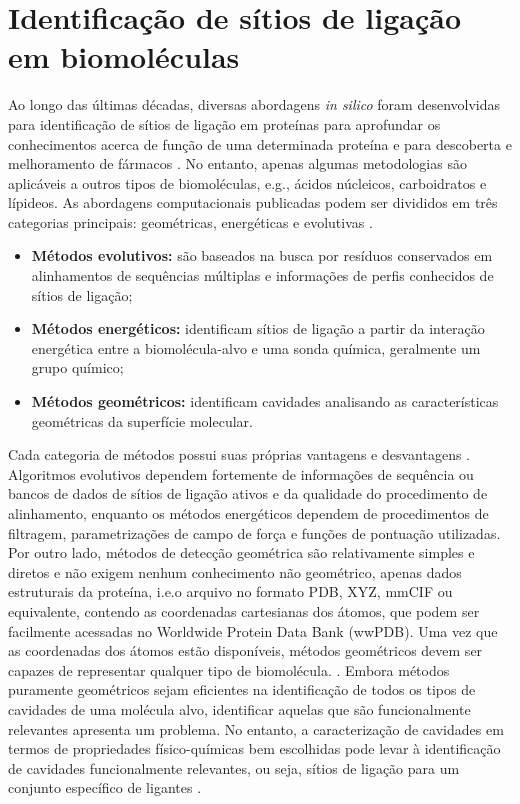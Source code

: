 \documentclass[Portugues]{phdquali}
\def\ie{i.e.\onedot}
\def\eg{e.g.\onedot}
\begin{document}
\section{Identificação de sítios de ligação em biomoléculas \label{sec:binding-sites}}

Ao longo das últimas décadas, diversas abordagens \textit{in silico} foram desenvolvidas para identificação de sítios de ligação em proteínas para aprofundar os conhecimentos acerca de função de uma determinada proteína e para descoberta e melhoramento de fármacos \cite{liang1998}. No entanto, apenas algumas metodologias são aplicáveis a outros tipos de biomoléculas, \eg, ácidos núcleicos, carboidratos e lípideos. As abordagens computacionais publicadas podem ser divididos em três categorias principais: geométricas, energéticas e evolutivas \cite{oliveira2014,simoes2017}.

\begin{itemize}
  \item \textbf{Métodos evolutivos:} são baseados na busca por resíduos conservados em alinhamentos de sequências múltiplas e informações de perfis conhecidos de sítios de ligação;
  \item \textbf{Métodos energéticos:} identificam sítios de ligação a partir da interação energética entre a biomolécula-alvo e uma sonda química, geralmente um grupo químico;
  \item \textbf{Métodos geométricos:} identificam cavidades analisando as características geométricas da superfície molecular.
\end{itemize}

Cada categoria de métodos possui suas próprias vantagens e desvantagens \cite{sotriffer2002,henrich2010,simoes2017,krone2016}. Algoritmos evolutivos dependem fortemente de informações de sequência ou bancos de dados de sítios de ligação ativos e da qualidade do procedimento de alinhamento, enquanto os métodos energéticos dependem de procedimentos de filtragem, parametrizações de campo de força e funções de pontuação utilizadas. Por outro lado, métodos de detecção geométrica são relativamente simples e diretos e não exigem nenhum conhecimento não geométrico, apenas dados estruturais da proteína, \ie o arquivo no formato PDB, XYZ, mmCIF ou equivalente, contendo as coordenadas cartesianas dos átomos, que podem ser facilmente acessadas no Worldwide Protein Data Bank (wwPDB). Uma vez que as coordenadas dos átomos estão disponíveis, métodos geométricos devem ser capazes de representar qualquer tipo de biomolécula. \cite{henrich2010,oliveira2014,simoes2017}. Embora métodos puramente geométricos sejam eficientes na identificação de todos os tipos de cavidades de uma molécula alvo, identificar aquelas que são funcionalmente relevantes apresenta um problema. No entanto, a caracterização de cavidades em termos de propriedades físico-químicas bem escolhidas pode levar à identificação de cavidades funcionalmente relevantes, ou seja, sítios de ligação para um conjunto específico de ligantes \cite{sotriffer2002,henrich2010,simoes2017,liang1998}.
\end{document}
